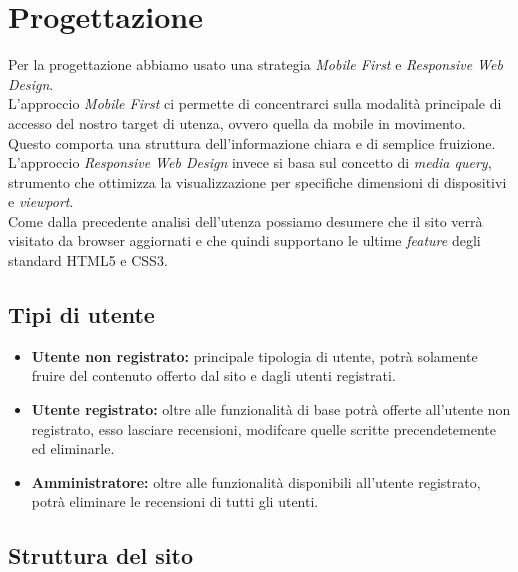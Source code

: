 \section{Progettazione}

Per la progettazione abbiamo usato una strategia \textit{Mobile First} e \textit{Responsive Web Design}.\\
L'approccio \textit{Mobile First} ci permette di concentrarci sulla modalità principale di accesso del nostro target di utenza, ovvero quella da mobile in movimento. Questo comporta una struttura dell'informazione chiara e di semplice fruizione.\\
L'approccio \textit{Responsive Web Design} invece si basa sul concetto di \textit{media query}, strumento che ottimizza la visualizzazione per specifiche dimensioni di dispositivi e \textit{viewport}.\\
Come dalla precedente analisi dell'utenza possiamo desumere che il sito verrà visitato da browser aggiornati e che quindi supportano le ultime \textit{feature} degli standard HTML5 e CSS3.\\

\subsection{Tipi di utente}

\begin{itemize}
    \item \textbf{Utente non registrato:} principale tipologia di utente, potrà solamente fruire del contenuto offerto dal sito e dagli utenti registrati.
    \item \textbf{Utente registrato:} oltre alle funzionalità di base potrà offerte all'utente non registrato, esso lasciare recensioni, modifcare quelle scritte precendetemente ed eliminarle.
    \item \textbf{Amministratore:} oltre alle funzionalità disponibili all'utente registrato, potrà eliminare le recensioni di tutti gli utenti.
\end{itemize}

\subsection{Struttura del sito}

